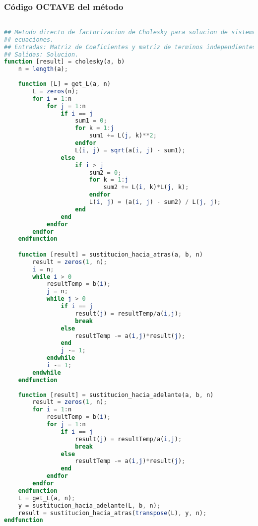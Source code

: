 \documentclass[12pt]{article}
\begin{document}
\subsubsection{Código OCTAVE del método}
\begin{lstlisting}[language=OCTAVE, caption=Implementación del método de Factorizacion de Cholesky en Octave]

## Metodo directo de factorizacion de Cholesky para solucion de sistemas de 
## ecuaciones.
## Entradas: Matriz de Coeficientes y matriz de terminos independientes.
## Salidas: Solucion.
function [result] = cholesky(a, b)
    n = length(a);
    
    function [L] = get_L(a, n)
        L = zeros(n);
        for i = 1:n
            for j = 1:n
                if i == j
                    sum1 = 0;
                    for k = 1:j
                        sum1 += L(j, k)**2;
                    endfor
                    L(i, j) = sqrt(a(i, j) - sum1);
                else 
                    if i > j
                        sum2 = 0;
                        for k = 1:j
                            sum2 += L(i, k)*L(j, k);
                        endfor    
                        L(i, j) = (a(i, j) - sum2) / L(j, j);
                    end
                end
            endfor
        endfor    
    endfunction

    function [result] = sustitucion_hacia_atras(a, b, n)
        result = zeros(1, n);
        i = n;
        while i > 0
            resultTemp = b(i);
            j = n;
            while j > 0
                if i == j
                    result(j) = resultTemp/a(i,j);
                    break
                else
                    resultTemp -= a(i,j)*result(j);
                end
                j -= 1;
            endwhile    
            i -= 1;
        endwhile
    endfunction
    
    function [result] = sustitucion_hacia_adelante(a, b, n)
        result = zeros(1, n);
        for i = 1:n
            resultTemp = b(i);
            for j = 1:n
                if i == j
                    result(j) = resultTemp/a(i,j);
                    break
                else
                    resultTemp -= a(i,j)*result(j);
                end
            endfor
        endfor    
    endfunction
    L = get_L(a, n);
    y = sustitucion_hacia_adelante(L, b, n);
    result = sustitucion_hacia_atras(transpose(L), y, n);
endfunction    

\end{lstlisting}
\end{document}
